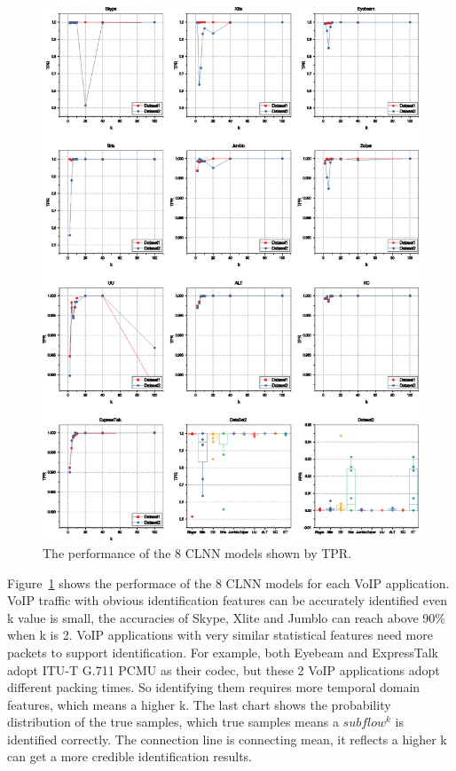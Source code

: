 \documentclass[conference]{IEEEtran}
\begin{document}
\begin{figure}[htp]
\begin{center}
\includegraphics[width=1\textwidth]{fprtpr.eps}
\caption{The performance of the 8 CLNN models shown by TPR.}\label{fig:fprtpr}
\end{center}
\end{figure}

Figure~\ref{fig:fprtpr} shows the performace of the 8 CLNN models for each VoIP application. VoIP traffic with obvious identification features can be accurately identified even k value is small, the accuracies of Skype, Xlite and Jumblo can reach above 90\% when k is 2. VoIP applications with very similar statistical features need more packets to support identification. For example, both Eyebeam and ExpressTalk adopt ITU-T G.711 PCMU as their codec, but these 2 VoIP applications adopt different packing times. So identifying them requires more temporal domain features, which means a higher k. The last chart shows the probability distribution of the true samples, which true samples means a $subflow^k$ is identified correctly. The connection line is connecting mean, it reflects a higher k can get a more credible identification results.
\end{document}
